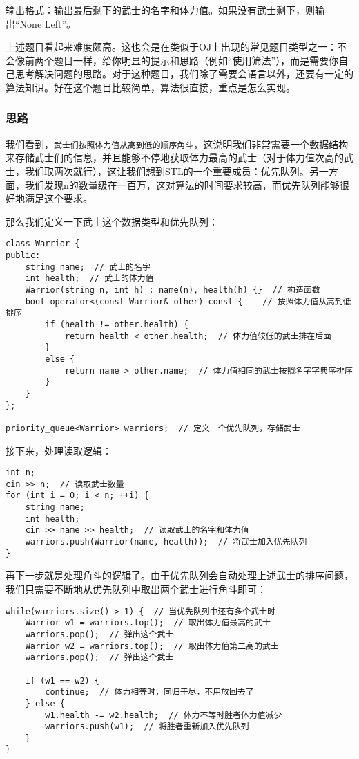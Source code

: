 \documentclass[../main.tex]{subfiles}
\begin{document}
输出格式：输出最后剩下的武士的名字和体力值。如果没有武士剩下，则输出“None Left”。

上述题目看起来难度颇高。这也会是在类似于OJ上出现的常见题目类型之一：不会像前两个题目一样，给你明显的提示和思路（例如“使用筛法”），而是需要你自己思考解决问题的思路。对于这种题目，我们除了需要会语言以外，还要有一定的算法知识。好在这个题目比较简单，算法很直接，重点是怎么实现。

\subsubsection{思路}
我们看到，\texttt{武士们按照体力值从高到低的顺序角斗}，这说明我们非常需要一个数据结构来存储武士们的信息，并且能够不停地获取体力最高的武士（对于体力值次高的武士，我们取两次就行），这让我们想到STL的一个重要成员：优先队列。另一方面，我们发现n的数量级在一百万，这对算法的时间要求较高，而优先队列能够很好地满足这个要求。

那么我们定义一下武士这个数据类型和优先队列：
\begin{lstlisting}
class Warrior {
public:
    string name;  // 武士的名字
    int health;  // 武士的体力值
    Warrior(string n, int h) : name(n), health(h) {}  // 构造函数
    bool operator<(const Warrior& other) const {    // 按照体力值从高到低排序
        if (health != other.health) {
            return health < other.health;  // 体力值较低的武士排在后面
        }
        else {
            return name > other.name;  // 体力值相同的武士按照名字字典序排序
        }
    }
};

priority_queue<Warrior> warriors;  // 定义一个优先队列，存储武士
\end{lstlisting}

接下来，处理读取逻辑：
\begin{lstlisting}
int n;
cin >> n;  // 读取武士数量
for (int i = 0; i < n; ++i) {
    string name;
    int health;
    cin >> name >> health;  // 读取武士的名字和体力值
    warriors.push(Warrior(name, health));  // 将武士加入优先队列
}
\end{lstlisting}

再下一步就是处理角斗的逻辑了。由于优先队列会自动处理上述武士的排序问题，我们只需要不断地从优先队列中取出两个武士进行角斗即可：
\begin{lstlisting}
while(warriors.size() > 1) {  // 当优先队列中还有多个武士时
    Warrior w1 = warriors.top();  // 取出体力值最高的武士
    warriors.pop();  // 弹出这个武士
    Warrior w2 = warriors.top();  // 取出体力值第二高的武士
    warriors.pop();  // 弹出这个武士

    if (w1 == w2) {
        continue;  // 体力相等时，同归于尽，不用放回去了
    } else {
        w1.health -= w2.health;  // 体力不等时胜者体力值减少
        warriors.push(w1);  // 将胜者重新加入优先队列
    }
}
\end{lstlisting}
\end{document}
